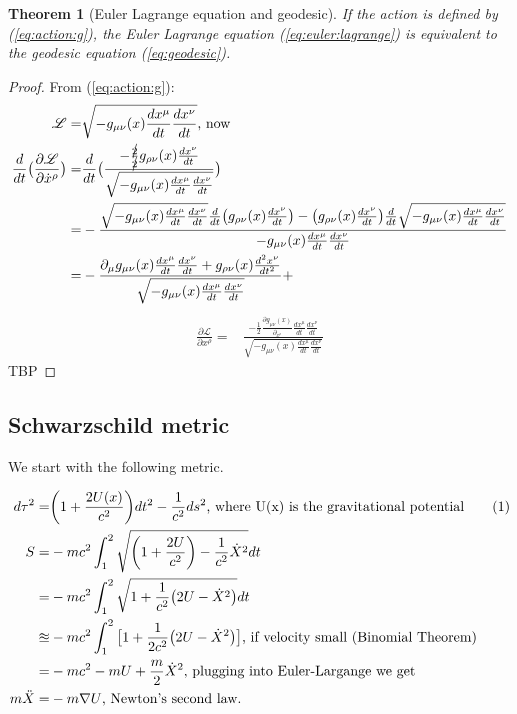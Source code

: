 \documentclass[]{article}
\newcommand\numberthis{\addtocounter{equation}{1}\tag{\theequation}}
\newcommand{\Lagr}{\mathscr{L}}
\newtheorem{thm}{Theorem}
\begin{document}
{\begin{thm}[Euler Lagrange equation and geodesic]
	If the action is defined by (\ref{eq:action:g}), the Euler Lagrange equation (\ref{eq:euler:lagrange}) is equivalent to the geodesic equation (\ref{eq:geodesic}).
\end{thm}
\begin{proof}
	From (\ref{eq:action:g}):
	\begin{align*}
		\Lagr =& \sqrt{-g_{\mu\nu}(x) \frac{dx^\mu}{dt} \frac{dx^\nu}{dt }} \text{, now}\\
		\frac{d}{dt}\big(\frac{\partial \Lagr}{\partial \dot{x}^\rho}\big) =& \frac{d}{dt} \big( \frac{-\frac{\cancel{2}}{\cancel{2}}g_{\rho\nu}(x) \frac{dx^\nu}{dt }}{\sqrt{-g_{\mu\nu}(x) \frac{dx^\mu}{dt} \frac{dx^\nu}{dt }}}\big)\\
		=&-\frac{\sqrt{-g_{\mu\nu}(x) \frac{dx^\mu}{dt} \frac{dx^\nu}{dt }}\frac{d}{dt}\big(g_{\rho\nu}(x) \frac{dx^\nu}{dt}\big) - \big(g_{\rho\nu}(x) \frac{dx^\nu}{dt}\big) \frac{d}{dt} \sqrt{-g_{\mu\nu}(x) \frac{dx^\mu}{dt} \frac{dx^\nu}{dt }} }{-g_{\mu\nu}(x) \frac{dx^\mu}{dt} \frac{dx^\nu}{dt}}\\
		=&-\frac{\partial_\mu g_{\mu\nu}(x) \frac{dx^\mu}{dt} \frac{dx^\nu}{dt } + g_{\rho\nu}(x) \frac{d^2x^\nu}{dt^2}}{\sqrt{-g_{\mu\nu}(x) \frac{dx^\mu}{dt} \frac{dx^\nu}{dt }}} +
	\end{align*}
	\begin{align*}
		\frac{\partial \Lagr}{\partial x^\rho}=& \frac{-\frac{1}{2}\frac{\partial g_{\mu\nu}(x)}{\partial_{x^\rho}} \frac{dx^\mu}{dt} \frac{dx^\nu}{dt }}{\sqrt{-g_{\mu\nu}(x) \frac{dx^\mu}{dt} \frac{dx^\nu}{dt }}}
	\end{align*}
	TBP
\end{proof}

\subsection{Schwarzschild metric}

We start with the following metric.

\begin{align*}
	d \tau^2 =& \bigg(1+\frac{2 U(x)}{c^2}\bigg) dt^2 - \frac{1}{c^2} ds^2 \text{, where U(x) is the gravitational potential} \numberthis \label{eq:sch:ansatz}\\
	S =& -m c^2 \int_{1}^{2} \sqrt{\bigg(1+\frac{2U}{c^2}\bigg) - \frac{1}{c^2}\dot{X}^2} dt\\
	=& -m c^2 \int_{1}^{2} \sqrt{1 +\frac{1}{c^2}\big(2U-\dot{X}^2\big)} dt\\
	\approxeq& -m c^2 \int_{1}^{2} \big[1 + \frac{1}{2c^2}\big(2U-\dot{X}^2\big)\big] \text{, if velocity small (Binomial Theorem)}\\
	=& -m c^2 -mU + \frac{m}{2} \dot{X}^2 \text{, plugging into Euler-Largange we get}\\
	m\ddot{X} =& -m \nabla U \text{, Newton's second law.}
\end{align*}

}
\end{document}
